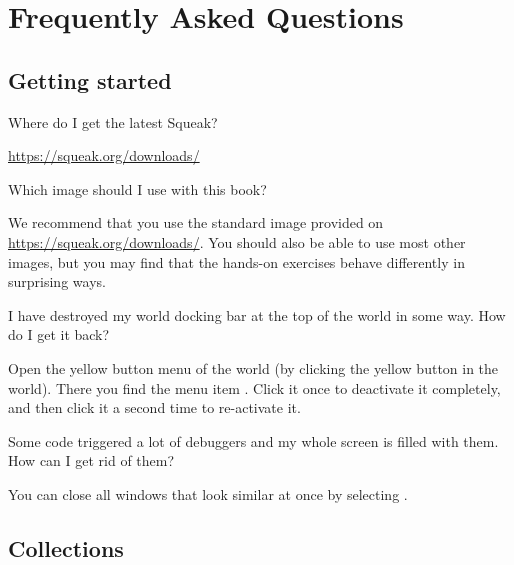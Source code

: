 \documentclass[a4paper,10pt,twoside]{book}
\begin{document}
	\renewcommand{\nnbb}[2]{} %
	\sloppy
\fi
\chapter{Frequently Asked Questions}
\label{app:faq}


\section{Getting started}
\begin{faq}
Where do I get the latest Squeak?
\end{faq}
\answer
\url{https://squeak.org/downloads/}

\begin{faq}
Which \sq image should I use with this book?
\end{faq}
\answer
We recommend that you use the standard image provided on \url{https://squeak.org/downloads/}.
You should also be able to use most other images, but you may find that the hands-on exercises behave differently in surprising ways.

\begin{faq}
I have destroyed my world docking bar at the top of the world in some way.
How do I get it back?
\end{faq}
\answer
Open the yellow button menu of the world (by clicking the yellow button in the world). 
There you find the menu item .
Click it once to deactivate it completely, and then click it a second time to re-activate it.

\begin{faq}
Some code triggered a lot of debuggers and my whole screen is filled with them. 
How can I get rid of them?
\end{faq}
\answer
You can close all windows that look similar at once by selecting .

\section{Collections}
\end{document}
